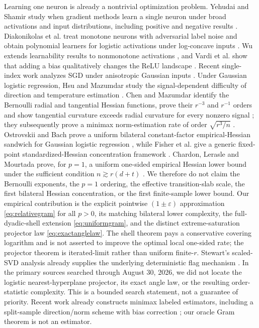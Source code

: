 \documentclass[11pt]{article}
\begin{document}
Learning one neuron is already a nontrivial optimization problem.  Yehudai and Shamir study when gradient methods
learn a single neuron under broad activations and input distributions, including positive and negative results
\cite{yehudai2020}.  Diakonikolas et al. treat monotone neurons with adversarial label noise and obtain polynomial
learners for logistic activations under log-concave inputs \cite{diakonikolas2022}.  Wu extends learnability results to
nonmonotone activations \cite{wu2022}, and Vardi et al. show that adding a bias qualitatively changes the ReLU
landscape \cite{vardi2021}.  Recent single-index work analyzes SGD under anisotropic Gaussian inputs
\cite{braun2025}.  Under Gaussian logistic regression, Hsu and Mazumdar study the signal-dependent difficulty of
direction and temperature estimation \cite{hsu2024}.  Chen and Mazumdar identify the Bernoulli radial and
tangential Hessian functions, prove their $r^{-3}$ and $r^{-1}$ orders and show tangential curvature exceeds radial
curvature for every nonzero signal \cite{chen2026gd}; they subsequently prove a minimax norm-estimation rate of
order $\sqrt{r^3/n}$ \cite{chen2026minimax}.  Ostrovskii and Bach prove a uniform bilateral constant-factor
empirical-Hessian sandwich for Gaussian logistic regression \cite[Eq.~(92)]{ostrovskii2021}, while Fisher et al.
give a generic fixed-point standardized-Hessian concentration framework \cite{fisher2023}.  Chardon, Lerasle and
Mourtada prove, for $p=1$, a uniform one-sided empirical Hessian lower bound under the sufficient condition
$n\gtrsim r(d+t)$ \cite[Theorem 6]{chardon2024}.  We therefore do not claim the Bernoulli exponents, the $p=1$
ordering, the effective transition-slab scale, the first bilateral Hessian concentration, or the first finite-sample
lower bound.  Our empirical contribution is the explicit pointwise $(1\pm\varepsilon)$ approximation
\eqref{eq:relativegram} for all $p>0$, its matching bilateral lower complexity, the full-dyadic-shell extension
\eqref{eq:uniformgram}, and the distinct extreme-saturation projector law
\eqref{eq:exactanglelaw}.  The shell theorem pays a conservative covering logarithm and is not asserted to improve the
optimal local one-sided rate; the projector theorem is iterated-limit rather than uniform finite-$r$.  Stewart's
scaled-SVD analysis already supplies the underlying deterministic flag mechanism \cite{stewart1984}.  In the primary
sources searched through August 30, 2026, we did not locate the logistic nearest-hyperplane projector, its exact
angle law, or the resulting order-statistic complexity.  This is a bounded search statement, not a guarantee of
priority.  Recent work already constructs minimax labeled estimators, including a split-sample
direction/norm scheme with bias correction \cite{chen2026minimax}; our oracle Gram theorem is not an estimator.
\end{document}
